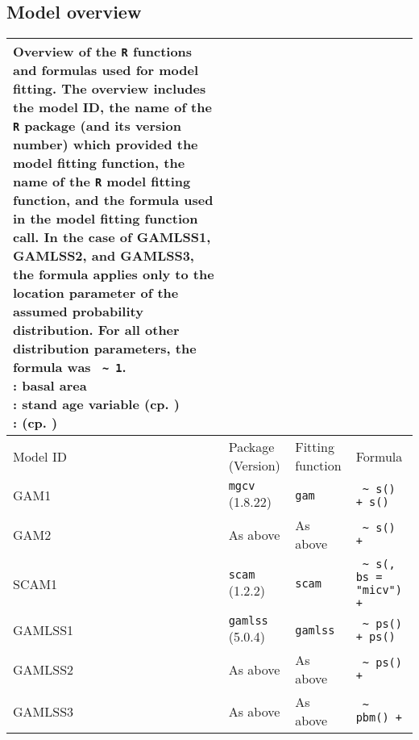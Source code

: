 \subsection{Model overview}

\begin{table}[H]
  {\tabulinesep=2mm
    \begin{longtabu}{L l l l}
      \caption{Overview of the \texttt{R} functions and formulas used for model fitting. The overview includes
        the model ID,
        the name of the \texttt{R} package (and its version number) which provided the model fitting function,
        the name of the \texttt{R} model fitting function,
        and the formula used in the model fitting function call.
        In the case of GAMLSS1, GAMLSS2, and GAMLSS3, the formula applies only to the location parameter of the assumed probability distribution.
        For all other distribution parameters, the formula was \texttt{\BasalAreaR{} \textasciitilde{} 1}. \\
        \BasalAreaR{}: basal area \\
        \StandAgeVariableR{}: stand age variable (cp. ) \\
        \ProductivityIndexVariableR{}: \ProductivityIndexVariableText{} (cp. )
        \label{tab:PresentedModelsOverviewFormulas}} \\
      \toprule
      Model ID & Package (Version) & Fitting function & Formula \\
      \midrule
      \endhead
      \bottomrule
      \endlastfoot
      GAM1 & \texttt{mgcv} (1.8.22) & \texttt{gam} & \texttt{\BasalAreaR{} \textasciitilde{} s(\StandAgeVariableR{}) + s(\ProductivityIndexVariableR{})} \\
      GAM2 & As above & As above & \texttt{\BasalAreaR{} \textasciitilde{} s(\StandAgeVariableR{}) + \ProductivityIndexVariableR{}} \\
      SCAM1 & \texttt{scam} (1.2.2) & \texttt{scam} & \texttt{\BasalAreaR{} \textasciitilde{} s(\StandAgeVariableR{}, bs = "micv") + \ProductivityIndexVariableR{}} \\
      GAMLSS1 & \texttt{gamlss} (5.0.4) & \texttt{gamlss} & \texttt{\BasalAreaR{} \textasciitilde{} ps(\StandAgeVariableR{}) + ps(\ProductivityIndexVariableR{})} \\
      GAMLSS2 & As above & As above & \texttt{\BasalAreaR{} \textasciitilde{} ps(\StandAgeVariableR{}) + \ProductivityIndexVariableR{}} \\
      GAMLSS3 & As above & As above & \texttt{\BasalAreaR{} \textasciitilde{} pbm(\StandAgeVariableR{}) + \ProductivityIndexVariableR{}} \\
      \bottomrule
    \end{longtabu}}
\end{table}

